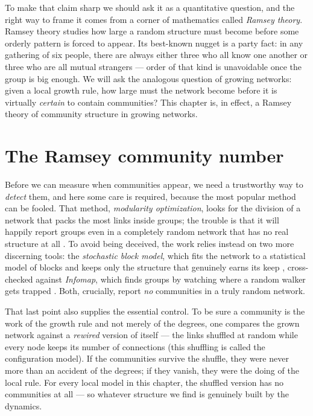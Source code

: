 To make that claim sharp we should ask it as a quantitative question, and the
right way to frame it comes from a corner of mathematics called \emph{Ramsey
theory}. Ramsey theory studies how large a random structure must become before
some orderly pattern is forced to appear. Its best-known nugget is a party fact:
in any gathering of six people, there are always either three who all know one
another or three who are all mutual strangers --- order of that kind is
unavoidable once the group is big enough. We will ask the analogous question of
growing networks: given a local growth rule, how large must the network become
before it is virtually \emph{certain} to contain communities? This chapter is, in
effect, a Ramsey theory of community structure in growing networks.

\section{The Ramsey community number}

Before we can measure when communities appear, we need a trustworthy way to
\emph{detect} them, and here some care is required, because the most popular
method can be fooled. That method, \emph{modularity optimization}, looks for the
division of a network that packs the most links inside groups; the trouble is
that it will happily report groups even in a completely random network that has
no real structure at all \citep{newman2006,fortunato2010}. To avoid being
deceived, the work relies instead on two more discerning tools: the
\emph{stochastic block model}, which fits the network to a statistical model of
blocks and keeps only the structure that genuinely earns its keep
\citep{karrer2011}, cross-checked against \emph{Infomap}, which finds groups by
watching where a random walker gets trapped \citep{rosvall2008}. Both, crucially,
report \emph{no} communities in a truly random network.

That last point also supplies the essential control. To be sure a community is
the work of the growth rule and not merely of the degrees, one compares the grown
network against a \emph{rewired} version of itself --- the links shuffled at
random while every node keeps its number of connections (this shuffling is called
the configuration model). If the communities survive the shuffle, they were never
more than an accident of the degrees; if they vanish, they were the doing of the
local rule. For every local model in this chapter, the shuffled version has no
communities at all --- so whatever structure we find is genuinely built by the
dynamics.

